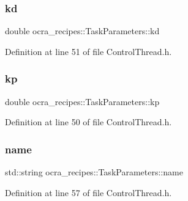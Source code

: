 \hypertarget{classocra__recipes_1_1TaskParameters_a8a90d9db17c0faeb26624899264eec9e}{}\label{classocra__recipes_1_1TaskParameters_a8a90d9db17c0faeb26624899264eec9e} 
\subsubsection{\texorpdfstring{kd}{kd}}
{\footnotesize\ttfamily double ocra\+\_\+recipes\+::\+Task\+Parameters\+::kd}



Definition at line 51 of file Control\+Thread.\+h.

\hypertarget{classocra__recipes_1_1TaskParameters_a644ed196f6bf867e46d7faab9ac287b3}{}\label{classocra__recipes_1_1TaskParameters_a644ed196f6bf867e46d7faab9ac287b3} 
\subsubsection{\texorpdfstring{kp}{kp}}
{\footnotesize\ttfamily double ocra\+\_\+recipes\+::\+Task\+Parameters\+::kp}



Definition at line 50 of file Control\+Thread.\+h.

\hypertarget{classocra__recipes_1_1TaskParameters_a8d9b23fed4d4207bed2b48625acb8910}{}\label{classocra__recipes_1_1TaskParameters_a8d9b23fed4d4207bed2b48625acb8910} 
\subsubsection{\texorpdfstring{name}{name}}
{\footnotesize\ttfamily std\+::string ocra\+\_\+recipes\+::\+Task\+Parameters\+::name}



Definition at line 57 of file Control\+Thread.\+h.

\hypertarget{classocra__recipes_1_1TaskParameters_a8c62a820309b362ba4ce8c515a66aff4}{}\label{classocra__recipes_1_1TaskParameters_a8c62a820309b362ba4ce8c515a66aff4} 
